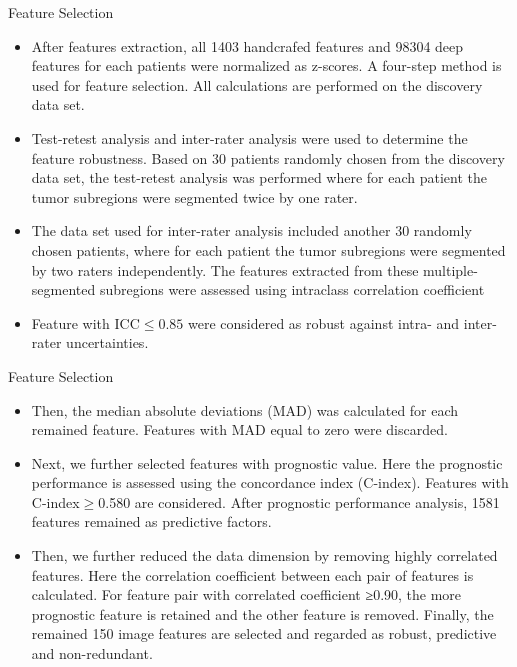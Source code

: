 \documentclass[
]{beamer}
\begin{document}
\begin{frame}{Feature Selection}
\begin{itemize}
	\item After features extraction, all 1403 handcrafed features and 98304 deep features for each
	patients were normalized as z-scores. A four-step method is used for feature selection. All calculations are performed on the
	discovery data set.
		\item Test-retest analysis and inter-rater analysis were used to determine the feature robustness. Based on 30 patients
		randomly chosen from the discovery data set, the test-retest analysis was performed where for each patient the
		tumor subregions were segmented twice by one rater.
		\item The data set used for inter-rater analysis included
		another 30 randomly chosen patients, where for each patient the tumor subregions were segmented by two raters
		independently. The features extracted from these multiple-segmented subregions were assessed using intraclass
		correlation coefficient 
		\item  Feature with ICC$\leq0.85$ were considered as robust against intra- and inter-rater
		uncertainties.
\end{itemize}
\end{frame}

\begin{frame}{Feature Selection}
\begin{itemize}
	\item Then, the median absolute deviations (MAD) was calculated for each remained feature. Features with MAD
	equal to zero were discarded.
	\item Next, we further selected features with prognostic value. Here the prognostic performance is assessed
	using the concordance index (C-index).  Features with C-index$\geq$0.580 are considered.  After prognostic performance analysis, 1581 features remained
	as predictive factors.
	\item Then, we further reduced
	the data dimension by removing highly correlated features. Here the correlation coefficient between each pair of
	features is calculated. For feature pair with correlated coefficient ≥0.90, the more prognostic feature is retained
	and the other feature is removed. Finally, the remained 150 image features are selected and regarded as robust,
	predictive and non-redundant.
\end{itemize}
\end{frame}
\end{document}
